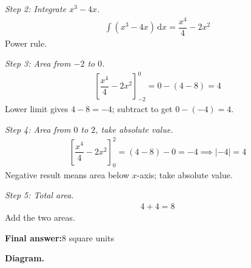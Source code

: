 \documentclass[11pt]{article}
\begin{document}
\textit{Step 2: Integrate \( x^3 - 4x \).}
\[\begin{gathered}
\int (x^3 - 4x)\, \mathrm{d}x = \dfrac{x^4}{4} - 2x^2
\end{gathered}\]
Power rule.

\textit{Step 3: Area from \( -2 \) to \( 0 \).}
\[\begin{gathered}
\left[\dfrac{x^4}{4} - 2x^2\right]_{-2}^{0} = 0 - (4 - 8) = 4
\end{gathered}\]
Lower limit gives \( 4 - 8 = -4 \); subtract to get \( 0 - (-4) = 4 \).

\textit{Step 4: Area from \( 0 \) to \( 2 \), take absolute value.}
\[\begin{gathered}
\left[\dfrac{x^4}{4} - 2x^2\right]_0^2 = (4 - 8) - 0 = -4 \implies |{-4}| = 4
\end{gathered}\]
Negative result means area below \( x \)-axis; take absolute value.

\textit{Step 5: Total area.}
\[\begin{gathered}
4 + 4 = 8
\end{gathered}\]
Add the two areas.

\begin{answerbox}
\textbf{Final answer:}\quad \(\displaystyle 8\) square units
\end{answerbox}
\textbf{Diagram.}
\end{document}
